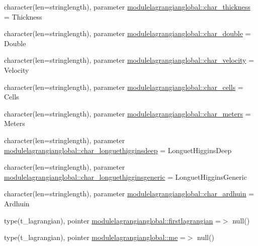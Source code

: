 \begin{DoxyCompactItemize}
\item 
character(len=stringlength), parameter \mbox{\hyperlink{namespacemodulelagrangianglobal_a5e846ff4cd18510f8519319bdd545282}{modulelagrangianglobal\+::char\+\_\+thickness}} = \textquotesingle{}Thickness\textquotesingle{}
\item 
character(len=stringlength), parameter \mbox{\hyperlink{namespacemodulelagrangianglobal_a74930488d66f9a63c6117790ad46dce3}{modulelagrangianglobal\+::char\+\_\+double}} = \textquotesingle{}Double\textquotesingle{}
\item 
character(len=stringlength), parameter \mbox{\hyperlink{namespacemodulelagrangianglobal_ad93b7447e47a46a0ec00c0c44cf9c75a}{modulelagrangianglobal\+::char\+\_\+velocity}} = \textquotesingle{}Velocity\textquotesingle{}
\item 
character(len=stringlength), parameter \mbox{\hyperlink{namespacemodulelagrangianglobal_aa2197bf29ce15cb5e251da0bd3e91d38}{modulelagrangianglobal\+::char\+\_\+cells}} = \textquotesingle{}Cells\textquotesingle{}
\item 
character(len=stringlength), parameter \mbox{\hyperlink{namespacemodulelagrangianglobal_aca21ed6e256783fd2bc203d28621b62f}{modulelagrangianglobal\+::char\+\_\+meters}} = \textquotesingle{}Meters\textquotesingle{}
\item 
character(len=stringlength), parameter \mbox{\hyperlink{namespacemodulelagrangianglobal_abab49ee7743fe04e5b6770213bca87f2}{modulelagrangianglobal\+::char\+\_\+longuethigginsdeep}} = \textquotesingle{}Longuet\+Higgins\+Deep\textquotesingle{}
\item 
character(len=stringlength), parameter \mbox{\hyperlink{namespacemodulelagrangianglobal_aa4788b27197b9ed8b4b38824d6dd7c24}{modulelagrangianglobal\+::char\+\_\+longuethigginsgeneric}} = \textquotesingle{}Longuet\+Higgins\+Generic\textquotesingle{}
\item 
character(len=stringlength), parameter \mbox{\hyperlink{namespacemodulelagrangianglobal_ac2beb6712fa14d25c55ed13cc11076df}{modulelagrangianglobal\+::char\+\_\+ardhuin}} = \textquotesingle{}Ardhuin\textquotesingle{}
\item 
type(t\+\_\+lagrangian), pointer \mbox{\hyperlink{namespacemodulelagrangianglobal_a23355c0e0c240a93d9b1e4dd5a894231}{modulelagrangianglobal\+::firstlagrangian}} =$>$ null()
\item 
type(t\+\_\+lagrangian), pointer \mbox{\hyperlink{namespacemodulelagrangianglobal_aa093dc1d2958bc73e2d1858e5a800b1a}{modulelagrangianglobal\+::me}} =$>$ null()
\end{DoxyCompactItemize}

